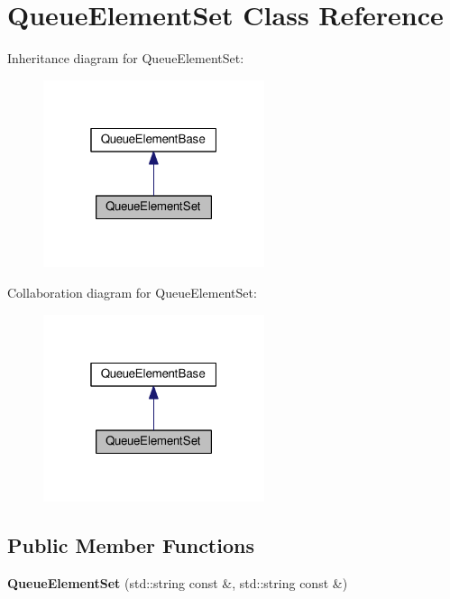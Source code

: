 \hypertarget{classQueueElementSet}{}\section{Queue\+Element\+Set Class Reference}
\label{classQueueElementSet}


Inheritance diagram for Queue\+Element\+Set\+:\nopagebreak
\begin{figure}[H]
\begin{center}
\leavevmode
\includegraphics[width=184pt]{classQueueElementSet__inherit__graph}
\end{center}
\end{figure}


Collaboration diagram for Queue\+Element\+Set\+:\nopagebreak
\begin{figure}[H]
\begin{center}
\leavevmode
\includegraphics[width=184pt]{classQueueElementSet__coll__graph}
\end{center}
\end{figure}
\subsection*{Public Member Functions}
\begin{DoxyCompactItemize}
\item 
{\bfseries Queue\+Element\+Set} (std\+::string const \&, std\+::string const \&)\hypertarget{classQueueElementSet_a3d61532cdffb0f520a4080c925416dd0}{}\label{classQueueElementSet_a3d61532cdffb0f520a4080c925416dd0}

\end{DoxyCompactItemize}
